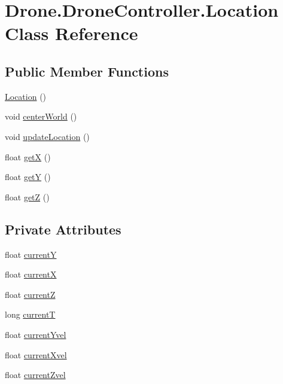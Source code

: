 \hypertarget{class_drone_1_1_drone_controller_1_1_location}{}\section{Drone.\+Drone\+Controller.\+Location Class Reference}
\label{class_drone_1_1_drone_controller_1_1_location}
\subsection*{Public Member Functions}
\begin{DoxyCompactItemize}
\item 
\hyperlink{class_drone_1_1_drone_controller_1_1_location_afa93ffeb3f24443667d192fc59593d00}{Location} ()
\item 
void \hyperlink{class_drone_1_1_drone_controller_1_1_location_ade44c8d7ef40f76ed148998673e18394}{center\+World} ()
\item 
void \hyperlink{class_drone_1_1_drone_controller_1_1_location_a98d3c771ad4f7635554cf31c6ca1cdab}{update\+Location} ()
\item 
float \hyperlink{class_drone_1_1_drone_controller_1_1_location_adf8e1ace00496678b463f7d80535cc32}{get\+X} ()
\item 
float \hyperlink{class_drone_1_1_drone_controller_1_1_location_afe958692386cf433f38c4badd4c945c2}{get\+Y} ()
\item 
float \hyperlink{class_drone_1_1_drone_controller_1_1_location_a206f5db58f3f733d62f04262b70664d7}{get\+Z} ()
\end{DoxyCompactItemize}
\subsection*{Private Attributes}
\begin{DoxyCompactItemize}
\item 
float \hyperlink{class_drone_1_1_drone_controller_1_1_location_a27aef452beeabcbace54668504ca341d}{current\+Y}
\item 
float \hyperlink{class_drone_1_1_drone_controller_1_1_location_ab30780155f9666ba1585f182c2c0a220}{current\+X}
\item 
float \hyperlink{class_drone_1_1_drone_controller_1_1_location_a83d271c394653007f31f7a5a31dcb2a6}{current\+Z}
\item 
long \hyperlink{class_drone_1_1_drone_controller_1_1_location_a079530c9c06ca16dc9f658b88b9c44b2}{current\+T}
\item 
float \hyperlink{class_drone_1_1_drone_controller_1_1_location_adff5260059e632576967773ffd15f219}{current\+Yvel}
\item 
float \hyperlink{class_drone_1_1_drone_controller_1_1_location_a8691b4eb0647ca3cf7d3a93f87bc6704}{current\+Xvel}
\item 
float \hyperlink{class_drone_1_1_drone_controller_1_1_location_a64772870a1e3318223eb6998fc8b8b5a}{current\+Zvel}
\end{DoxyCompactItemize}
